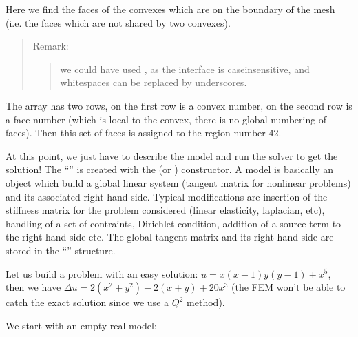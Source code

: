 \documentclass[a4paper,11pt,english]{sphinxmanual}
\begin{document}
Here we find the faces of the convexes which are on the boundary of the mesh (i.e.
the faces which are not shared by two convexes).
\begin{quote}

Remark:
\begin{quote}

we could have used , as the interface is
case\sphinxhyphen{}insensitive, and whitespaces can be replaced by underscores.
\end{quote}
\end{quote}

The array  has two rows, on the first row is a convex number, on the
second row is a face number (which is local to the convex, there is no global
numbering of faces). Then this set of faces is assigned to the region number 42.

At this point, we just have to describe the model and run the solver to get the
solution! The “” is created with the  (or )
constructor. A model is basically an object which build a global linear system
(tangent matrix for non\sphinxhyphen{}linear problems) and its associated right hand side.
Typical modifications are insertion of the stiffness matrix for the problem
considered (linear elasticity, laplacian, etc), handling of a set of contraints,
Dirichlet condition, addition of a source term to the right hand side etc. The
global tangent matrix and its right hand side are stored in the “”
structure.

Let us build a problem with an easy solution: \(u=x(x-1)y(y-1)+x^5\), then we
have \(\Delta u=2(x^2+y^2)-2(x+y)+20x^3\) (the FEM won’t be able to catch the
exact solution since we use a \(Q^2\) method).

We start with an empty real model:

\begin{sphinxVerbatim}[commandchars=\\\{\}]
 
   
\end{sphinxVerbatim}
\end{document}
